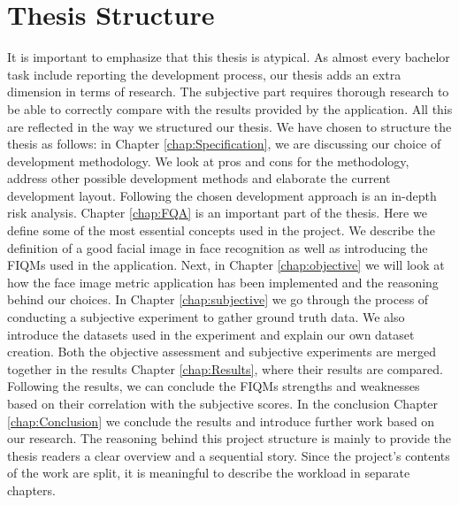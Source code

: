 \section{Thesis Structure}
It is important to emphasize that this thesis is atypical. As almost every bachelor task include reporting the development process, our thesis adds an extra dimension in terms of research. The subjective part requires thorough research to be able to correctly compare with the results provided by the application. All this are reflected in the way we structured our thesis. 
We have chosen to structure the thesis as follows: in Chapter \ref{chap:Specification}, we are discussing our choice of development methodology. We look at pros and cons for the methodology, address other possible development methods and elaborate the current development layout. Following the chosen development approach is an in-depth risk analysis. Chapter \ref{chap:FQA} is an important part of the thesis. Here we define some of the most essential concepts used in the project. We describe the definition of a good facial image in face recognition as well as introducing the FIQMs used in the application. Next, in Chapter \ref{chap:objective} we will look at how the face image metric application has been implemented and the reasoning behind our choices. In Chapter \ref{chap:subjective} we go through the process of conducting a subjective experiment to gather ground truth data. We also introduce the datasets used in the experiment and explain our own dataset creation. 
Both the objective assessment and subjective experiments are merged together in the results Chapter \ref{chap:Results}, where their results are compared. Following the results, we can conclude the FIQMs strengths and weaknesses based on their correlation with the subjective scores. In the conclusion Chapter \ref{chap:Conclusion} we conclude the results and introduce further work based on our research. The reasoning behind this project structure is mainly to provide the thesis readers a clear overview and a sequential story. Since the project's contents of the work are split, it is meaningful to describe the workload in separate chapters. 